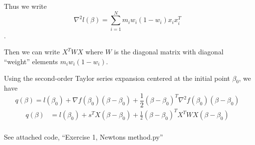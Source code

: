 \documentclass[12pt]{article}
\newenvironment{problem}[2][Exercise]{\begin{trivlist}
\item[\hskip \labelsep {\bfseries #1}\hskip \labelsep {\bfseries #2.}]}{\end{trivlist}}
\begin{document}
\begin{problem}{C}
Thus we write $$\nabla^2 l (\beta) = \sum_{i=1}^N m_iw_i(1-w_i)x_ix_i^T$$.

Then we can write $X^T W X$ where $W$ is the diagonal matrix with diagonal ``weight'' elements $m_iw_i(1-w_i)$.


Using the second-order Taylor series expansion centered at the initial point $\beta_0$, we have
$$q(\beta) = l(\beta_0) + \nabla f(\beta_0)(\beta - \beta_0) + \frac{1}{2} (\beta - \beta_0)^T \nabla^2 f(\beta_0)(\beta - \beta_0)$$
\begin{align*}
q(\beta) &= l(\beta_0) + s^TX(\beta - \beta_0) + \frac{1}{2}(\beta - \beta_0)^T X^TWX (\beta - \beta_0)\\
\end{align*}
\end{problem}

\begin{problem}{D}
See attached code, ``Exercise 1, Newtons method.py''
\end{problem}

\begin{problem}{E}

\end{problem}
\end{document}
